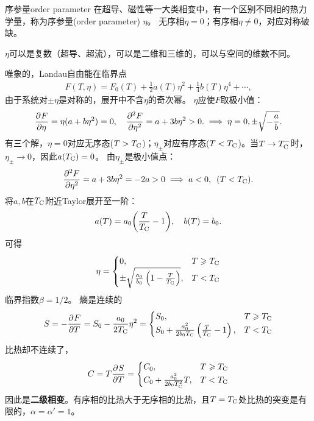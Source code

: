 \begin{definition}
	{序参量}{order parameter}
	在超导、磁性等一大类相变中，有一个区别不同相的热力学量，称为序参量(order parameter) $\eta$。
	无序相$\eta=0$；有序相$\eta\neq 0$，对应对称破缺。
\end{definition}

\begin{remark}
	$\eta$可以是复数（超导、超流），可以是二维和三维的，可以与空间的维数不同。
\end{remark}




唯象的，Landau自由能在临界点
\begin{align}
	F(T,\eta)=F_0(T)+\frac12a(T)\eta^2+\frac14b(T)\eta^4+\cdots,
\end{align}
由于系统对$\pm\eta$是对称的，展开中不含$\eta$的奇次幂。
$\eta$应使$F$取极小值：
\[
	\pv F\eta=\eta(a+b\eta^2)=0,
	\quad\pv[2]F\eta=a+3b\eta^2>0.
	\implies\eta=0,\pm\sqrt{-\frac ab}.
\]
有三个解，$\eta=0$对应无序态($T>T_\crt$)；$\eta_\pm$对应有序态($T<T_\crt$)。当$T\to T_\crt^-$时，$\eta_\pm\to 0$，因此$a(T_\crt)=0$。
由$\eta_\pm$是极小值点：
\[
	\pv[2]F\eta=a+3b\eta^2=-2a>0
	\implies a<0,\enspace (T<T_\crt).
\]
将$a,b$在$T_\crt$附近Taylor展开至一阶：
\[
	a(T)=a_0\biggkh{\frac T{T_\crt}-1},\quad b(T)=b_0.
\]
可得
\begin{equation}
	\eta=
	\begin{cases}
		0,&T\geqslant T_\crt\\
		\pm\sqrt{\frac{a_0}{b_0}\kh{1-\frac T{T_\crt}}},&T<T_\crt
	\end{cases}
\end{equation}
临界指数$\beta=1/2$。
熵是连续的
\begin{equation}
	S=-\pv FT=S_0-\frac{a_0}{2T_\crt}\eta^2=
	\begin{cases}
		S_0,                             & T\geqslant T_\crt \\
		S_0+\frac{a_0^2}{2b_0T_\crt}\kh{\frac T{T_\crt}-1}, & T<T_\crt
	\end{cases}
\end{equation}
比热却不连续了，
\begin{equation}
	C=T\pv ST=
	\begin{cases}
		C_0,                 & T\geqslant T_\crt \\
		C_0+\frac{a_0^2}{2b_0T_\crt^2}T, & T<T_\crt
	\end{cases}
\end{equation}
因此是\textbf{二级相变}。有序相的比热大于无序相的比热，且$T=T_\crt$处比热的突变是有限的，$\alpha=\alpha'=1$。

